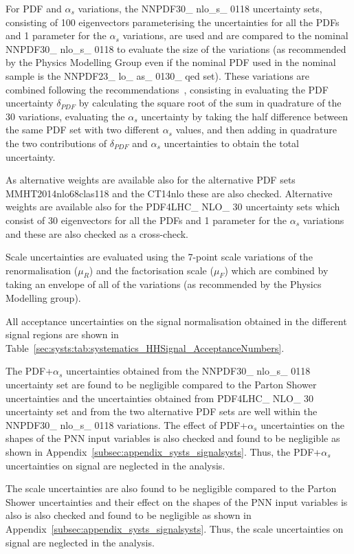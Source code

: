 For PDF and $\alpha_s$ variations, the NNPDF30\_ nlo\_s\_ 0118 uncertainty sets, consisting of 100 eigenvectors parameterising the uncertainties for all the PDFs and 1 parameter for the $\alpha_s$ variations, are used and are compared to the nominal NNPDF30\_ nlo\_s\_ 0118 to evaluate the size of the variations (as recommended by the Physics Modelling Group even if the nominal PDF used in the nominal sample is the NNPDF23\_ lo\_ as\_ 0130\_ qed set). These variations are combined following the recommendations~\cite{Butterworth:2015oua}, consisting in evaluating the PDF uncertainty $\delta_{PDF}$ by calculating the square root of the sum in quadrature of the 30 variations, evaluating the $\alpha_s$ uncertainty by taking the half difference between the same PDF set with two different $\alpha_s$ values, and then adding in quadrature the two contributions of $\delta_{PDF}$ and $\alpha_s$ uncertainties to obtain the total uncertainty. 

As alternative weights are available also for the alternative PDF sets MMHT2014nlo68clas118 and the CT14nlo these are also checked. Alternative weights are available also for the PDF4LHC\_ NLO\_ 30 uncertainty sets which consist of 30 eigenvectors for all the PDFs and 1 parameter for the $\alpha_s$ variations and these are also checked as a cross-check. 

Scale uncertainties are evaluated using the 7-point scale variations of the renormalisation ($\mu_R$) and the factorisation scale ($\mu_F$) which are combined by taking an envelope of all of the variations (as recommended by the Physics Modelling group). 

All acceptance uncertainties on the signal normalisation obtained in the different signal regions are shown in Table~\ref{sec:systs:tab:systematics_HHSignal_AcceptanceNumbers}.  

The PDF+$\alpha_s$ uncertainties obtained from the NNPDF30\_ nlo\_s\_ 0118 uncertainty set are found to be negligible compared to the Parton Shower uncertainties and the uncertainties obtained from PDF4LHC\_ NLO\_ 30 uncertainty set and from the two alternative PDF sets are well within the NNPDF30\_ nlo\_s\_ 0118 variations. The effect of PDF+$\alpha_s$ uncertainties on the shapes of the PNN input variables is also checked and found to be negligible as shown in Appendix~\ref{subsec:appendix_systs_signalsysts}. Thus, the PDF+$\alpha_s$ uncertainties on signal are neglected in the analysis. 

The scale uncertainties are also found to be negligible compared to the Parton Shower uncertainties and their effect on the shapes of the PNN input variables is also is also checked and found to be negligible as shown in Appendix~\ref{subsec:appendix_systs_signalsysts}. Thus, the scale uncertainties on signal are neglected in the analysis. 

